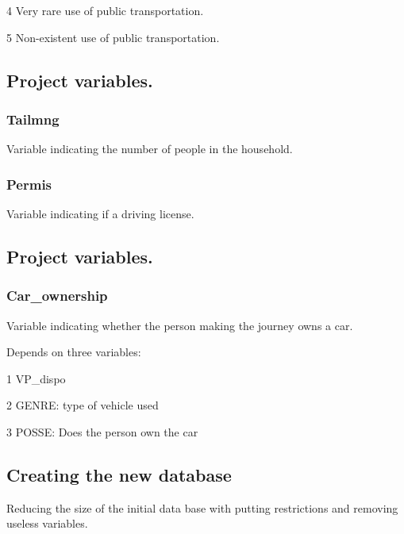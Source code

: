 \documentclass[
]{article}
\begin{document}
4\textbar{} Very rare use of public transportation.

5\textbar{} Non-existent use of public transportation.

\hypertarget{project-variables.-1}{%
\subsection{Project variables.}\label{project-variables.-1}}

\hypertarget{tailmng}{%
\subsubsection{Tailmng}\label{tailmng}}

Variable indicating the number of people in the household.

\hypertarget{permis}{%
\subsubsection{Permis}\label{permis}}

Variable indicating if a driving license.

\hypertarget{project-variables.-2}{%
\subsection{Project variables.}\label{project-variables.-2}}

\hypertarget{car_ownership}{%
\subsubsection{Car\_ownership}\label{car_ownership}}

Variable indicating whether the person making the journey owns a car.

Depends on three variables:

1 \textbar{} VP\_dispo

2 \textbar{} GENRE: type of vehicle used

3 \textbar{} POSSE: Does the person own the car

\hypertarget{creating-the-new-database}{%
\subsection{Creating the new database}\label{creating-the-new-database}}

Reducing the size of the initial data base with putting restrictions and
removing useless variables.
\end{document}
